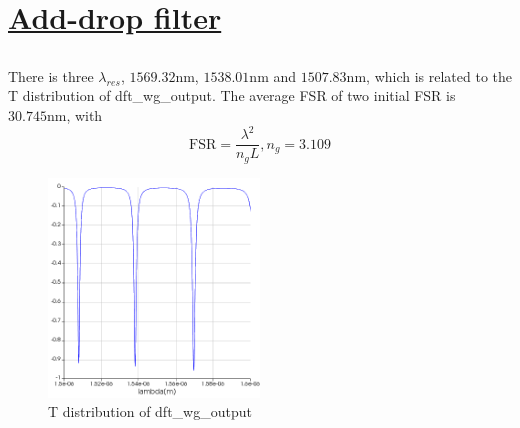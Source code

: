 \documentclass[fontsize=11pt]{scrartcl}
\begin{document}
\section{\uline{Add-drop filter}}
\subsection{}
There is three $\lambda_{res}$, $1569.32\mathrm{nm}$, $1538.01\mathrm{nm}$ and $1507.83\mathrm{nm}$, which is related to 
the T distribution of dft\_wg\_output. The average FSR of two initial FSR is $30.745\mathrm{nm}$, with 
\begin{equation} 
    \mathrm{FSR} =  \frac{\lambda ^{2} }{n_gL}, n_g=3.109
    \label{eq3}
\end{equation}
\begin{figure}[H]
    \centering
     \includegraphics[width=0.5\textwidth]{img/fig3.1.png}
     \caption{T distribution of dft\_wg\_output}
     \label{fig3.1}
\end{figure} 
\end{document}
